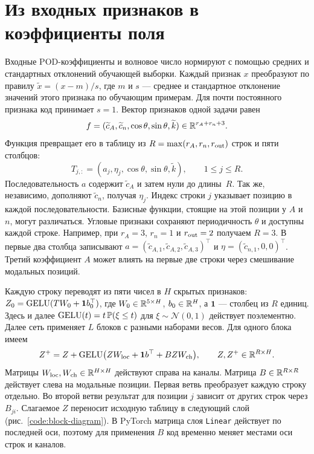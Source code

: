 \section{Из входных признаков в коэффициенты поля}
\label{code:network}

Входные POD-коэффициенты и волновое число нормируют с помощью средних
и стандартных отклонений обучающей выборки. Каждый признак $x$
преобразуют по правилу $\widetilde x=(x-m)/s$, где $m$ и $s$ ---
среднее и стандартное отклонение значений этого признака по обучающим
примерам. Для почти постоянного признака код принимает $s=1$.
Вектор признаков одной задачи равен
\begin{equation}
 f=(\widetilde c_A,\widetilde c_n,\cos\theta,\sin\theta,\widetilde k)
       \in\mathbb{R}^{r_A+r_n+3}.
 \label{code:feature-vector}
\end{equation}
Функция  превращает его в таблицу из
$R=\max(r_A,r_n,r_{\rm out})$ строк и пяти столбцов:
\begin{equation}
 T_{j,:}=(a_j,\eta_j,\cos\theta,\sin\theta,\widetilde k),\qquad
 1\le j\le R .
 \label{code:tokens}
\end{equation}
Последовательность $a$ содержит $\widetilde c_A$ и затем нули до
длины~$R$. Так же, независимо, дополняют $\widetilde c_n$, получая $\eta_j$.
Индекс строки $j$ указывает позицию в каждой последовательности.
Базисные функции, стоящие на этой позиции у $A$ и $n$, могут различаться.
Угловые признаки сохраняют периодичность $\theta$ и доступны каждой строке.
Например, при $r_A=3$, $r_n=1$ и $r_{\rm out}=2$ получаем $R=3$.
В первые два столбца записывают
$a=(\widetilde c_{A,1},\widetilde c_{A,2},\widetilde c_{A,3})^\top$
и $\eta=(\widetilde c_{n,1},0,0)^\top$. Третий коэффициент $A$
может влиять на первые две строки через смешивание модальных позиций.

Каждую строку переводят из пяти чисел в $H$ скрытых признаков:
$Z_0=\operatorname{GELU}(TW_0+\bm 1 b_0^\top)$, где $W_0\in\mathbb{R}^{5\times H}$,
$b_0\in\mathbb{R}^H$, а $\bm 1$ --- столбец из $R$ единиц.
Здесь и далее $\operatorname{GELU}(t)=t\,\mathbb P(\xi\le t)$ для
$\xi\sim\mathcal N(0,1)$ действует поэлементно. Далее сеть применяет
$L$ блоков с разными наборами весов. Для одного блока имеем
\begin{equation}
 Z^+=Z+\operatorname{GELU}\bigl(ZW_{\rm loc}+\bm 1 b^\top+BZ W_{\rm ch}\bigr),
 \qquad Z,Z^+\in\mathbb{R}^{R\times H}.
 \label{code:block}
\end{equation}
Матрицы $W_{\rm loc},W_{\rm ch}\in\mathbb{R}^{H\times H}$ действуют справа на
каналы. Матрица $B\in\mathbb{R}^{R\times R}$ действует слева на модальные
позиции. Первая ветвь преобразует каждую строку отдельно. Во второй
ветви результат для позиции $j$ зависит от других строк через $B_{ji}$.
Слагаемое $Z$ переносит исходную таблицу в следующий слой
(рис.~\ref{code:block-diagram}).
В PyTorch матрица слоя \texttt{Linear} действует по последней оси,
поэтому для применения $B$ код временно меняет местами оси строк и каналов.

